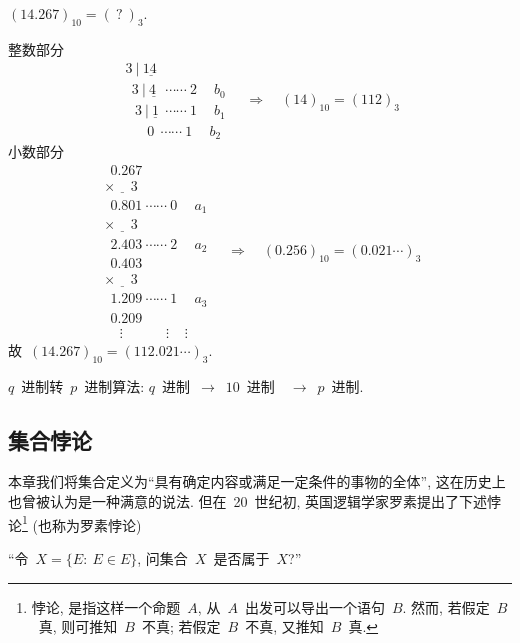 \begin{example}
$(14.267)_{10} = (~?~)_{3}$.
\end{example}

\begin{solution}
整数部分
\[
\left.
\begin{array}{l}
3~ | \! \underline{~14~~} \\[-0.2em]
~~3~ | \! \underline{~4~~} ~\cdots\cdots~ 2~ \quad b_0 \\[-0.2em]
~~\ 3~ | \! \underline{~1~} ~\cdots\cdots~ 1~ \quad b_1 \\[-0.2em]
~~~~~~~0~~\cdots\cdots~ 1~ \quad b_2
\end{array}
\right.
\quad \Longrightarrow \quad (14)_{10} = (112)_3
\]
小数部分
\[
\left.
\begin{array}{l}
~~0.267 \\[-0.3em]
\underline{\times ~~~~~3~} \\[-0.1em]
~~0.801 ~\cdots\cdots~ 0 ~\quad a_1 \\[-0.3em]
\underline{\times ~~~~~3~}  \\[-0.1em]
~~2.403 ~\cdots\cdots~ 2 ~\quad a_2 \\[-0.2em]
~~0.403 \\[-0.3em]
\underline{\times ~~~~~3~}  \\[-0.1em]
~~1.209 ~\cdots\cdots~ 1 ~\quad a_3 \\[-0.2em]
~~0.209 \\[-0.2em]
~~~~~\vdots ~~~~~~~~~~~~~~\vdots~~~~~\vdots
\end{array}
\right.
\quad \Longrightarrow \quad (0.256)_{10} = (0.021\cdots)_3
\]
故~$(14.267)_{10} = (112.021\cdots)_{3}$.
\end{solution}

$q$~进制转~$p$~进制算法: $q$~进制~$\rightarrow$~$10$~进制~~$\rightarrow$~$p$~进制.

\subsection*{集合悖论}

本章我们将集合定义为``具有确定内容或满足一定条件的事物的全体'', 这在历史上也曾被认为是一种满意的说法. 但在~20~世纪初, 英国逻辑学家罗素提出了下述悖论\footnote{悖论, 是指这样一个命题~$A$, 从~$A$~出发可以导出一个语句~$B$. 然而, 若假定~$B$~真, 则可推知~$B$~不真; 若假定~$B$~不真, 又推知~$B$~真. }
(也称为罗素悖论)
\begin{center}
``令~$X=\{E:\: E \in E\}$, 问集合~$X$~是否属于~$X$?''
\end{center}


